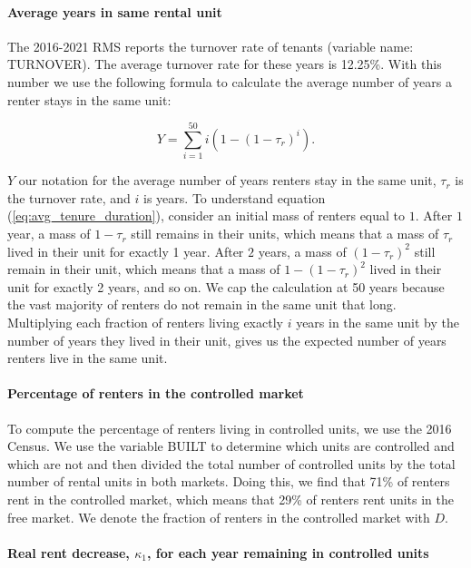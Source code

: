 \documentclass[parskip=full]{article}
\begin{document}
\paragraph{Average years in same rental unit}

The 2016-2021 RMS reports the turnover rate of tenants (variable name: TURNOVER). The average turnover rate for these years is 12.25\%. With this number we use the following formula to calculate the average number of years a renter stays in the same unit:

\begin{equation}\label{eq:avg_tenure_duration}
    Y=\sum_{i=1}^{50}i(1-(1-\tau_{r})^{i}).
\end{equation}

\noindent $Y$ our notation for the average number of years renters stay in the same unit, $\tau_{r}$ is the turnover rate, and $i$ is years. To understand equation (\ref{eq:avg_tenure_duration}), consider an initial mass of renters equal to $1$. After $1$ year, a mass of $1-\tau_{r}$ still remains in their units, which means that a mass of $\tau_{r}$ lived in their unit for exactly 1 year. After $2$ years, a mass of $(1-\tau_{r})^2$ still remain in their unit, which means that a mass of $1-(1-\tau_{r})^2$ lived in their unit for exactly 2 years, and so on. We cap the calculation at 50 years because the vast majority of renters do not remain in the same unit that long. Multiplying each fraction of renters living exactly $i$ years in the same unit by the number of years they lived in their unit, gives us the expected number of years renters live in the same unit.

\paragraph{Percentage of renters in the controlled market}

To compute the percentage of renters living in controlled units, we use the 2016 Census. We use the variable BUILT to determine which units are controlled and which are not and then divided the total number of controlled units by the total number of rental units in both markets. Doing this, we find that 71\% of renters rent in the controlled market, which means that 29\% of renters rent units in the free market. We denote the fraction of renters in the controlled market with $D$.

\paragraph{Real rent decrease, $\kappa_{1}$, for each year remaining in controlled units}
\end{document}

